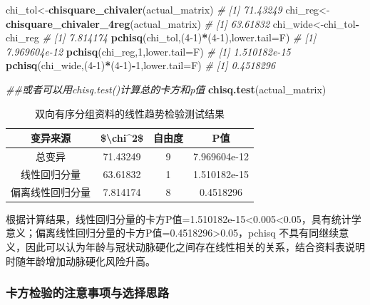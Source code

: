 \documentclass[
]{article}
\newenvironment{Shaded}{\begin{snugshade}}{\end{snugshade}}
\newcommand{\CommentTok}[1]{\textcolor[rgb]{0.56,0.35,0.01}{\textit{#1}}}
\newcommand{\DataTypeTok}[1]{\textcolor[rgb]{0.13,0.29,0.53}{#1}}
\newcommand{\DecValTok}[1]{\textcolor[rgb]{0.00,0.00,0.81}{#1}}
\newcommand{\KeywordTok}[1]{\textcolor[rgb]{0.13,0.29,0.53}{\textbf{#1}}}
\newcommand{\NormalTok}[1]{#1}
\newcommand{\OperatorTok}[1]{\textcolor[rgb]{0.81,0.36,0.00}{\textbf{#1}}}
\begin{document}
\begin{Shaded}
\begin{Highlighting}[]
\NormalTok{chi_tol<-}\KeywordTok{chisquare_chivaler}\NormalTok{(actual_matrix)}
\CommentTok{# [1] 71.43249}
\NormalTok{chi_reg<-}\KeywordTok{chisquare_chivaler_4reg}\NormalTok{(actual_matrix)}
\CommentTok{# [1] 63.61832}
\NormalTok{chi_wide<-chi_tol}\OperatorTok{-}\NormalTok{chi_reg}
\CommentTok{# [1] 7.814174}
\KeywordTok{pchisq}\NormalTok{(chi_tol,(}\DecValTok{4-1}\NormalTok{)}\OperatorTok{*}\NormalTok{(}\DecValTok{4-1}\NormalTok{),}\DataTypeTok{lower.tail=}\NormalTok{F)}
\CommentTok{# [1] 7.969604e-12}
\KeywordTok{pchisq}\NormalTok{(chi_reg,}\DecValTok{1}\NormalTok{,}\DataTypeTok{lower.tail=}\NormalTok{F)}
\CommentTok{# [1] 1.510182e-15}
\KeywordTok{pchisq}\NormalTok{(chi_wide,(}\DecValTok{4-1}\NormalTok{)}\OperatorTok{*}\NormalTok{(}\DecValTok{4-1}\NormalTok{)}\OperatorTok{-}\DecValTok{1}\NormalTok{,}\DataTypeTok{lower.tail=}\NormalTok{F)}
\CommentTok{# [1] 0.4518296}

\CommentTok{##或者可以用chisq.test()计算总的卡方和p值}
\KeywordTok{chisq.test}\NormalTok{(actual_matrix)}
\end{Highlighting}
\end{Shaded}

\begin{table}

\caption{\label{tab:chisqtab8}双向有序分组资料的线性趋势检验测试结果}
\centering
\begin{tabular}[t]{cccc}
\toprule
变异来源 & \$\textbackslash{}chi\textasciicircum{}2\$ & 自由度 & P值\\
\midrule
总变异 & 71.43249 & 9 & 7.969604e-12\\
线性回归分量 & 63.61832 & 1 & 1.510182e-15\\
偏离线性回归分量 & 7.814174 & 8 & 0.4518296\\
\bottomrule
\end{tabular}
\end{table}

根据计算结果，线性回归分量的卡方P值=1.510182e-15\textless0.005\textless0.05，具有统计学意义；偏离线性回归分量的卡方P值=0.4518296\textgreater0.05，pchisq
不具有同继续意义，因此可以认为年龄与冠状动脉硬化之间存在线性相关的关系，结合资料表说明时随年龄增加动脉硬化风险升高。

\hypertarget{ux5361ux65b9ux68c0ux9a8cux7684ux6ce8ux610fux4e8bux9879ux4e0eux9009ux62e9ux601dux8def}{%
\subsubsection{卡方检验的注意事项与选择思路}\label{ux5361ux65b9ux68c0ux9a8cux7684ux6ce8ux610fux4e8bux9879ux4e0eux9009ux62e9ux601dux8def}}
\end{document}

